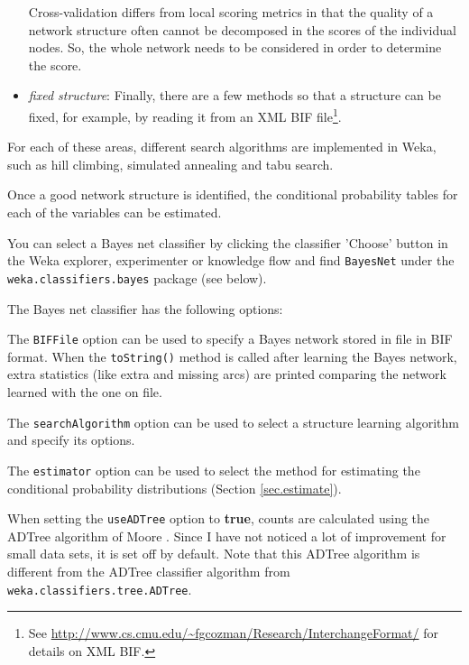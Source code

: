 \begin{itemize}
Cross-validation differs from local scoring metrics  in that the quality
of a network structure often cannot be decomposed in the scores of the
individual nodes. So, the whole network needs to be considered in order
to determine the score.

\item {\em fixed structure}:
Finally, there are a few methods so that a structure can be fixed, for
example, by reading it from an XML BIF file\footnote{See
{\sf \url{http://www.cs.cmu.edu/~fgcozman/Research/InterchangeFormat/}{}}
for details on XML BIF.}.
\end{itemize}

For each of these areas, different search algorithms are implemented in 
Weka, such as hill climbing, simulated annealing and tabu search.

Once a good network structure is identified, the conditional probability
tables for each of the variables can be estimated.

You can select a Bayes net classifier by clicking the classifier 'Choose' button in 
the Weka explorer, experimenter or knowledge flow and find {\tt BayesNet}
under the {\tt weka.classifiers.bayes} package (see below).

\begin{center}
\end{center}

The Bayes net classifier has the following options:

\begin{center}
\end{center}

The {\tt BIFFile} option can be used to specify a Bayes network stored in
file in BIF format. When the {\tt toString()} method is called after learning the
Bayes network, extra statistics (like extra and missing arcs) are printed 
comparing the network learned with the one on file.

The {\tt searchAlgorithm} option can be used to select a structure learning
algorithm and specify its options.

The {\tt estimator} option can be used to select the method for estimating the
conditional probability distributions (Section \ref{sec.estimate}).

When setting the {\tt useADTree} option to \textbf{true}, counts are calculated using the
ADTree algorithm of Moore \cite{Moore}. Since I have not noticed a lot of 
improvement for small data sets, it is set off by default.
Note that this ADTree algorithm is different from the ADTree classifier algorithm
from {\tt weka.classifiers.tree.ADTree}.


